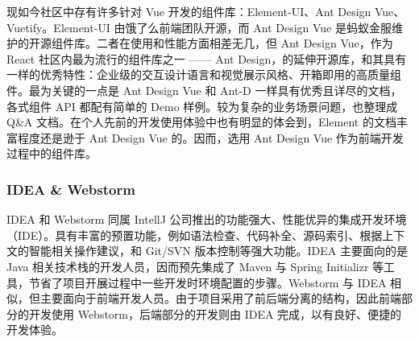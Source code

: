 现如今社区中存有许多针对 Vue 开发的组件库：Element-UI、Ant Design Vue、Vuetify。Element-UI 由饿了么前端团队开源，而 Ant Design Vue 是蚂蚁金服维护的开源组件库。二者在使用和性能方面相差无几，但 Ant Design Vue，作为React 社区内最为流行的组件库之一 —— Ant Design，的延伸开源库，和其具有一样的优秀特性：企业级的交互设计语言和视觉展示风格、开箱即用的高质量组件。最为关键的一点是 Ant Design Vue 和 Ant-D 一样具有优秀且详尽的文档，各式组件 API 都配有简单的 Demo 样例。较为复杂的业务场景问题，也整理成 Q\&A 文档。在个人先前的开发使用体验中也有明显的体会到，Element 的文档丰富程度还是逊于 Ant Design Vue 的。因而，选用 Ant Design Vue 作为前端开发过程中的组件库。

\subsubsection{IDEA \& Webstorm}
IDEA 和 Webstorm 同属 IntellJ 公司推出的功能强大、性能优异的集成开发环境（IDE）。具有丰富的预置功能，例如语法检查、代码补全、源码索引、根据上下文的智能相关操作建议，和 Git/SVN 版本控制等强大功能。IDEA 主要面向的是 Java 相关技术栈的开发人员，因而预先集成了 Maven 与 Spring Initializr 等工具，节省了项目开展过程中一些开发时环境配置的步骤。Webstorm 与 IDEA 相似，但主要面向于前端开发人员。由于项目采用了前后端分离的结构，因此前端部分的开发使用 Webstorm，后端部分的开发则由 IDEA 完成，以有良好、便捷的开发体验。

